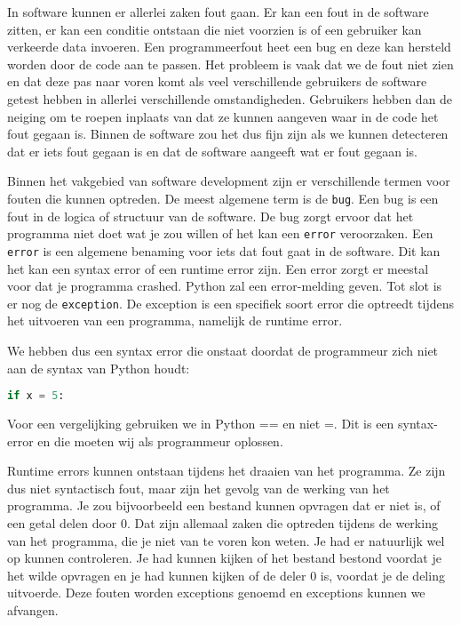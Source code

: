 In software kunnen er allerlei zaken fout gaan. Er kan een fout in de software zitten, er kan een conditie ontstaan die niet voorzien is of een gebruiker kan verkeerde data invoeren. Een programmeerfout heet een bug en deze kan hersteld worden door de code aan te passen. Het probleem is vaak dat we de fout niet zien en dat deze pas naar voren komt als veel verschillende gebruikers de software getest hebben in allerlei verschillende omstandigheden. Gebruikers hebben dan de neiging om te roepen  inplaats van dat ze kunnen aangeven waar in de code het fout gegaan is. Binnen de software zou het dus fijn zijn als we kunnen detecteren dat er iets fout gegaan is en dat de software aangeeft wat er fout gegaan is.

Binnen het vakgebied van software development zijn er verschillende termen voor fouten die kunnen optreden. De meest algemene term is de \texttt{bug}. Een bug is een fout in de logica of structuur van de software. De bug zorgt ervoor dat het programma niet doet wat je zou willen of het kan een \texttt{error} veroorzaken. Een \texttt{error} is een algemene benaming voor iets dat fout gaat in de software. Dit kan het kan een syntax error of een runtime error zijn. Een error zorgt er meestal voor dat je programma crashed. Python zal een error-melding geven. Tot slot is er nog de \texttt{exception}. De exception is een specifiek soort error die optreedt tijdens het uitvoeren van een programma, namelijk de runtime error.

We hebben dus een syntax error die onstaat doordat de programmeur zich niet aan de syntax van Python houdt:
\begin{lstlisting}[language=python]
if x = 5:
\end{lstlisting}
Voor een vergelijking gebruiken we in Python == en niet =. Dit is een syntax-error en die moeten wij als programmeur oplossen.

Runtime errors kunnen ontstaan tijdens het draaien van het programma. Ze zijn dus niet syntactisch fout, maar zijn het gevolg van de werking van het programma. Je zou bijvoorbeeld een bestand kunnen opvragen dat er niet is, of een getal delen door 0. Dat zijn allemaal zaken die optreden tijdens de werking van het programma, die je niet van te voren kon weten. Je had er natuurlijk wel op kunnen controleren. Je had kunnen kijken of het bestand bestond voordat je het wilde opvragen en je had kunnen kijken of de deler 0 is, voordat je de deling uitvoerde. Deze fouten worden exceptions genoemd en exceptions kunnen we afvangen.

